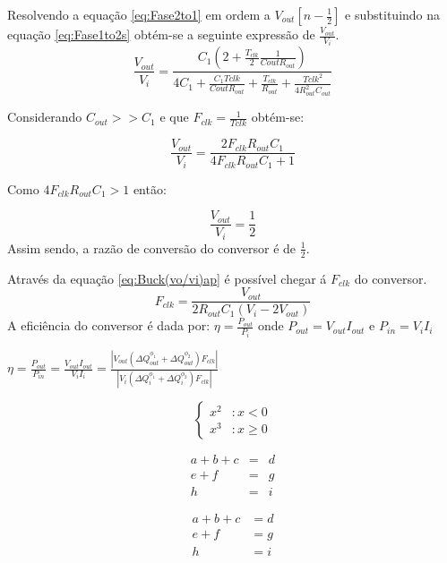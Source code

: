 \documentclass[12pt]{article}
\begin{document}
Resolvendo a equação \ref{eq:Fase2to1} em ordem a $V_{out}[n-\frac{1}{2}]$ e substituindo na equação \ref{eq:Fase1to2s} obtém-se a seguinte expressão de $\frac{V_{out}}{V_i}$.
\begin{equation}
\label{eq:Buck(vo/vi)}
\frac{V_{out}}{V_i} = \frac{C_1(2 + \frac{T_{clk}}{2}\frac{1}{C{out}R_{out}})}{4C_1+ \frac{C_1T{clk}}{C{out}R_{out}} +  \frac{T_{clk}}{R_{out}} + \frac{T{clk}^2}{4R_{out}^2C_{out}} }
\end{equation}
\vspace{5mm} 

Considerando $C_{out}>> C_1$ e que $F_{clk} = \frac{1}{T{clk}}$ obtém-se:
\vspace{5mm}     

\begin{equation}
\label{eq:Buck(vo/vi)ap}
\frac{V_{out}}{V_i} = \frac{2F_{clk}R_{out}C_1}{4F_{clk}R_{out}C_1+ 1}
\end{equation}
\vspace{5mm}  

Como $4F_{clk}R_{out}C_1 > 1$ então: 

\begin{equation}
\label{eq:Buck(vo/vi)f}
\frac{V_{out}}{V_i} = \frac{1}{2}
\end{equation}
\vspace{5mm}  
Assim sendo, a razão de conversão do conversor é de $\frac{1}{2}$.

Através da equação \ref{eq:Buck(vo/vi)ap} é possível chegar á $F_{clk}$ do conversor.
\begin{equation}
\label{eq:FBuck(vo/vi)}
F_{clk}=\frac{V_{out}}{2R_{out}C_{1}(V_i-2V_{out})}
\end{equation}
\vspace{5mm}
A eficiência do conversor é dada por: $\eta = \frac{P_{out}}{P_{i}}$ onde $P_{out} = V_{out}I_{out}$ e $P_{in} = V_{i}I_{i}$

\begin{center}
{\large $\eta = \frac{P_{out}}{P_{in}} = \frac{ V_{out}I_{out}}{ V_iI_i} = \frac{|V_{out}(\Delta Q^{\phi_1}_{out} + \Delta Q^{\phi_2}_{out})F_{clk}|}{{|V_i(\Delta Q^{\phi_1}_{i} + \Delta Q^{\phi_2}_{i})F_{clk}|}}$}
\end{center}


\[\left\{
  \begin{array}{lr}
    x^2 & : x < 0\\
    x^3 & : x \ge 0
  \end{array}
\right.
\]

\begin{equation}
  \begin{array}{rrr}
    a + b + c & = & d \\        e + f     & = & g \\        h         & = & i
  \end{array}
\end{equation}

\begin{equation}
  \begin{aligned}
    a + b + c & =  d \\        e + f     & =  g \\        h         & =  i
  \end{aligned}
\end{equation}
\end{document}
